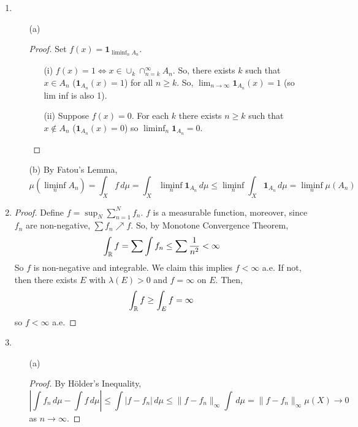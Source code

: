 \begin{enumerate}
\item \begin{itemize}
	\item[(a)] \begin{proof}
	Set $f(x) = \mathbf{1}_{\liminf_n A_n}$.
	\begin{itemize}
	\item[(i)] $f(x)=1 \iff x \in \cup_{k} \cap_{n=k}^\infty A_n$. So, there exists $k$ such that $x \in A_n$ ($\mathbf{1}_{A_n}(x)=1$) for all $n \ge k$. So, $\lim_{n\to \infty} \mathbf{1}_{A_n}(x) = 1$ (so lim inf is also 1).
	\item[(ii)] Suppose $f(x) =0$. For each $k$ there exists $n \ge k$ such that $x \not\in A_n$ ($\mathbf{1}_{A_n}(x)=0$) so $\liminf_n \mathbf{1}_{A_n}=0$.
	\end{itemize}	
	\end{proof}
	\item[(b)] By Fatou's Lemma,
	\[ \mu(\liminf_n A_n) = \int_X f \, d\mu = \int_X \liminf_n \mathbf{1}_{A_n} \, d\mu \le \liminf_n \int_X \mathbf{1}_{A_n} \, d\mu = \liminf_n \mu(A_n) \]
	\end{itemize}
\item \begin{proof} Define $f = \sup_N \sum_{n=1}^N f_n$. $f$ is a measurable function, moreover, since $f_n$ are non-negative, $\sum f_n \nearrow f$. So, by Monotone Convergence Theorem,
	\[ \int_{\mathbb{R}} f = \sum \int f_n \le \sum \dfrac{1}{n^2} < \infty \]
So $f$ is non-negative and integrable. We claim this implies $f < \infty$ a.e. If not, then there exists $E$ with $\lambda(E) >0$ and $f=\infty$ on $E$. Then,
	\[ \int_{\mathbb{R}} f \ge \int_E f = \infty \]
so $f < \infty $ a.e.
\end{proof}

\item \begin{itemize}
	\item[(a)] \begin{proof}
	By H\"older's Inequality,
	\[ \left| \int f_n \, d\mu - \int f \, d\mu \right| \le \int |f-f_n| \, d\mu \le \|f-f_n\|_\infty \int \, d\mu = \|f-f_n\|_\infty \mu(X) \to 0 \]
	as $n \to \infty$.
	\end{proof}
\end{itemize}
\end{enumerate}